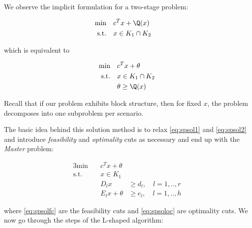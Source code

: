 We observe the implicit formulation for a two-stage problem:

\begin{alignat*}{2}
\textrm{min}  \quad & c^Tx +\Q(x) \ \\
\textrm{s.t.} \quad & x\in K_1 \cap K_2 & \
\end{alignat*}

which is equivalent to

\begin{alignat}{2}
\textrm{min}  \quad & c^Tx +\theta \ \\
\textrm{s.t.} \quad & x\in K_1 \cap K_2 \ \label{eq:spsol1}\\
                    & \theta \geq  \Q(x) \label{eq:spsol2} \
\end{alignat}

Recall that if our problem exhibits block structure, then for fixed $x$,
the problem decomposes into one subproblem per scenario.

The basic idea behind this solution method is to relax \ref{eq:spsol1}
and \ref{eq:spsol2} and introduce \emph{feasibility} and \emph{optimality}
cuts as necessary and end up with the \emph{Master} problem:

\begin{alignat}{3}
\textrm{min}  \quad & c^Tx +\theta & \ \\
\textrm{s.t.} \quad & x\in K_1  & \\
                    & D_l x           & \geq d_l, \quad l = 1,..,r \label{eq:spsolfc} \ \\
                    & E_l x  + \theta & \geq e_l, \quad l = 1,..,h \label{eq:spsoloc} \
\end{alignat}

where \ref{eq:spsolfc} are the feasibility cuts and \ref{eq:spsoloc} are 
optimality cuts. We now go through the steps of the L-shaped algorithm:\\

